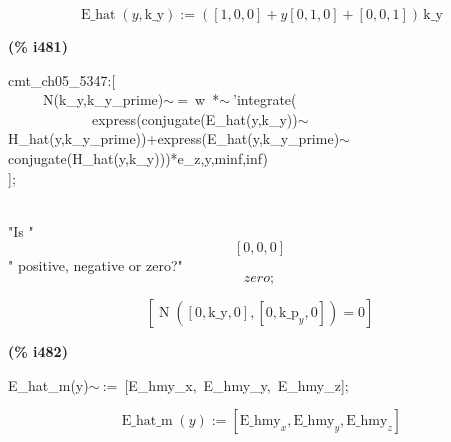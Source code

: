 \documentclass[fleqn]{article}
\begin{document}
\[\tag{\% o480} 
\operatorname{E\_ hat}\left( y\operatorname{,}\ensuremath{\mathrm{k\_ y}}\right) \operatorname{:=}\left( \left[ 1\operatorname{,}0\operatorname{,}0\right] +y \left[ 0\operatorname{,}1\operatorname{,}0\right] +\left[ 0\operatorname{,}0\operatorname{,}1\right] \right) \, \ensuremath{\mathrm{k\_ y}}\mbox{}
\]


\noindent
\begin{minipage}[t]{4.000000em}\color{red}\bfseries
(\% i481)	
\end{minipage}
\begin{minipage}[t]{\textwidth}\color{blue}
cmt\_ch05\_5347:[\\
\ \ \ \ \ N(k\_y,k\_y\_prime)\ensuremath{\sim\ }=\ w\ *\ensuremath{\sim\ }'integrate(\\
\ \ \ \ \ \ \ \ \ \ \ \ express(conjugate(E\_hat(y,k\_y))\ensuremath{\sim\ }H\_hat(y,k\_y\_prime))+express(E\_hat(y,k\_y\_prime)\ensuremath{\sim\ }conjugate(H\_hat(y,k\_y)))*e\_z,y,minf,inf)\ \\
];
\end{minipage}
\mbox{}\\"Is "
\[\displaystyle \left[ 0\operatorname{,}0\operatorname{,}0\right] \mbox{}
\]" positive, negative or zero?"
\[\displaystyle zero;\mbox{}\]

\[\tag{\% o481} 
\left[ \operatorname{N}\left( \left[ 0\operatorname{,}\ensuremath{\mathrm{k\_ y}}\operatorname{,}0\right] \operatorname{,}\left[ 0\operatorname{,}{{\ensuremath{\mathrm{k\_ p}}}_y}\operatorname{,}0\right] \right) =0\right] \mbox{}
\]


\noindent
\begin{minipage}[t]{4.000000em}\color{red}\bfseries
(\% i482)	
\end{minipage}
\begin{minipage}[t]{\textwidth}\color{blue}
E\_hat\_m(y)\ensuremath{\sim\ }:=\ [E\_hmy\_x,\ E\_hmy\_y,\ E\_hmy\_z];
\end{minipage}
\[\displaystyle \tag{\% o482} 
\operatorname{E\_ hat\_ m}(y)\operatorname{:=}\left[ {{\ensuremath{\mathrm{E\_ hmy}}}_x}\operatorname{,}{{\ensuremath{\mathrm{E\_ hmy}}}_y}\operatorname{,}{{\ensuremath{\mathrm{E\_ hmy}}}_z}\right] \mbox{}
\]
\end{document}
